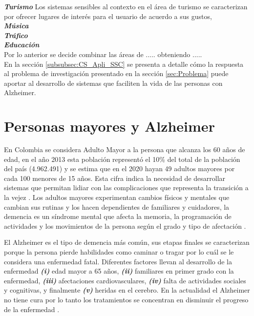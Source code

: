 \textbf{\textit{Turismo}} Los sistemas sensibles al contexto en el área de turismo se caracterizan por ofrecer lugares de interés para el usuario de acuerdo a sus gustos,  \\

\textbf{\textit{Música}}
\\

\textbf{\textit{Tráfico}}
\\

\textbf{\textit{Educación}}
\\

Por lo anterior se decide combinar las áreas de ..... obteniendo .....\\

En la sección \ref{subsubsec:CS_Apli_SSC} se presenta a detalle cómo la respuesta al problema de investigación presentado en la sección \ref{sec:Problema} puede aportar al desarrollo de sistemas que faciliten la vida de las personas con Alzheimer.



\section{Personas mayores y Alzheimer}
\label{sec:CS_PersonasyAlz}

En Colombia se considera Adulto Mayor a la persona que alcanza los 60 años de edad, en el año 2013 esta población representó el 10\% del total de la población del país (4.962.491) y se estima que en el 2020 hayan 49 adultos mayores por cada 100 menores de 15 años. Esta cifra indica la necesidad de desarrollar sistemas que permitan lidiar con las complicaciones que representa la transición a la vejez \cite{ministeriodesalud2013}. Los adultos mayores experimentan cambios físicos y mentales que cambian sus rutinas y los hacen dependientes de familiares y cuidadores, la demencia es un síndrome mental que afecta la memoria, la programación de actividades y los movimientos de la persona según el grado y tipo de afectación \cite{Fargo2014}.

El Alzheimer es el tipo de demencia más común, sus etapas finales se caracterizan porque la persona pierde habilidades como caminar o tragar por lo cuál se le considera una enfermedad fatal. Diferentes factores llevan al desarrollo de la enfermedad \textbf{\textit{(i)}} edad mayor a 65 años, \textbf{\textit{(ii)}} familiares en primer grado con la enfermedad, \textbf{\textit{(iii)}} afectaciones cardiovasculares, \textbf{\textit{(iv)}} falta de actividades sociales y cognitivas, y finalmente \textbf{\textit{(v)}} heridas en el cerebro. En la actualidad el Alzheimer no tiene cura por lo tanto los tratamientos se concentran en disminuir el progreso de la enfermedad \cite{Fargo2014}.

